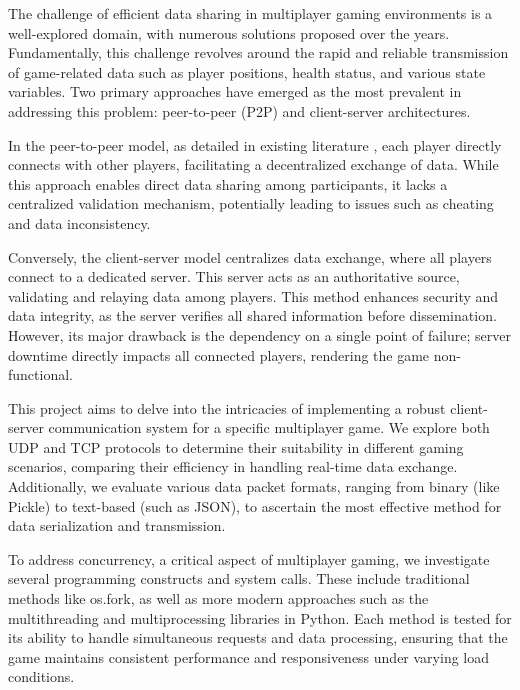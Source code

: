 The challenge of efficient data sharing in multiplayer gaming environments is a well-explored domain, with numerous solutions proposed over the years. Fundamentally, this challenge revolves around the rapid and reliable transmission of game-related data such as player positions, health status, and various state variables. Two primary approaches have emerged as the most prevalent in addressing this problem: peer-to-peer (P2P) and client-server architectures.

In the peer-to-peer model, as detailed in existing literature \cite{peertopeer}, each player directly connects with other players, facilitating a decentralized exchange of data. While this approach enables direct data sharing among participants, it lacks a centralized validation mechanism, potentially leading to issues such as cheating and data inconsistency.

Conversely, the client-server model \cite{clientserver} centralizes data exchange, where all players connect to a dedicated server. This server acts as an authoritative source, validating and relaying data among players. This method enhances security and data integrity, as the server verifies all shared information before dissemination. However, its major drawback is the dependency on a single point of failure; server downtime directly impacts all connected players, rendering the game non-functional.

This project aims to delve into the intricacies of implementing a robust client-server communication system for a specific multiplayer game. We explore both UDP and TCP protocols to determine their suitability in different gaming scenarios, comparing their efficiency in handling real-time data exchange. Additionally, we evaluate various data packet formats, ranging from binary (like Pickle) to text-based (such as JSON), to ascertain the most effective method for data serialization and transmission.

To address concurrency, a critical aspect of multiplayer gaming, we investigate several programming constructs and system calls. These include traditional methods like os.fork, as well as more modern approaches such as the multithreading and multiprocessing libraries in Python. Each method is tested for its ability to handle simultaneous requests and data processing, ensuring that the game maintains consistent performance and responsiveness under varying load conditions.


